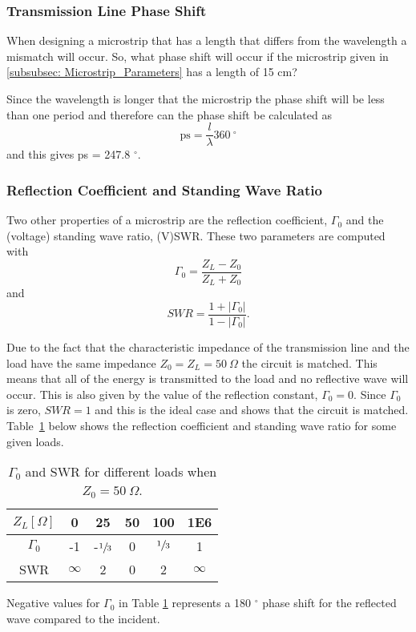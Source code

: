 \documentclass[report.tex]{subfiles}
\begin{document}
\subsubsection{Transmission Line Phase Shift}\label{subsubsec: Lab1 Phase Shift}
When designing a microstrip that has a length that differs from the wavelength a mismatch will occur. So, what phase shift will occur if the microstrip given in \ref{subsubsec: Microstrip_Parameters} has a length of 15 cm?

Since the wavelength is longer that the microstrip the phase shift will be less than one period and therefore can the phase shift be calculated as
\begin{equation}
	\text{ps} = \dfrac{l}{\lambda} 360 \:^\circ
\end{equation}
and this gives ps = 247.8 $^\circ$.
\subsubsection{Reflection Coefficient and Standing Wave Ratio}\label{subsec:Lab1 RC and SWR}
Two other properties of a microstrip are the reflection coefficient, $\Gamma_0$ and the (voltage) standing wave ratio, (V)SWR. These two parameters are computed with
\begin{equation}
	\Gamma_0 = \dfrac{Z_L - Z_0}{Z_L + Z_0}
\end{equation}
and
\begin{equation}
	SWR = \dfrac{1 + \left|\Gamma_0\right|}{1 - \left|\Gamma_0\right|}\text{.}
\end{equation}

Due to the fact that the characteristic impedance of the transmission line and the load have the same impedance $Z_0 = Z_L = 50\:\Omega$ the circuit is matched. This means that all of the energy is transmitted to the load and no reflective wave will occur. This is also given by the value of the reflection constant, $\Gamma_0 = 0$. Since $\Gamma_0$ is zero, $SWR = 1$ and this is the ideal case and shows that the circuit is matched. Table~\ref{table: RC and SWR} below shows the reflection coefficient and standing wave ratio for some given loads.

\begin{table}[h]
    \centering
    \caption{$\Gamma_0$ and SWR for different loads when $Z_0= 50\: \Omega$.}
    \begin{tabular}{c | c c c c c}
         $Z_L [\Omega]$ & 0 & 25 & 50 & 100 & 1E6 \\
         \hline
         $\Gamma_0$ & -1 & -$\sfrac{1}{3}$ & 0 & $\sfrac{1}{3}$ & 1 \\
         SWR & $\infty$ & 2 & 0 & 2 & $\infty$
    \end{tabular}\label{table: RC and SWR}
\end{table}

Negative values for $\Gamma_0$ in Table \ref{table: RC and SWR} represents a 180 $^\circ$ phase shift for the reflected wave compared to the incident.
\end{document}
